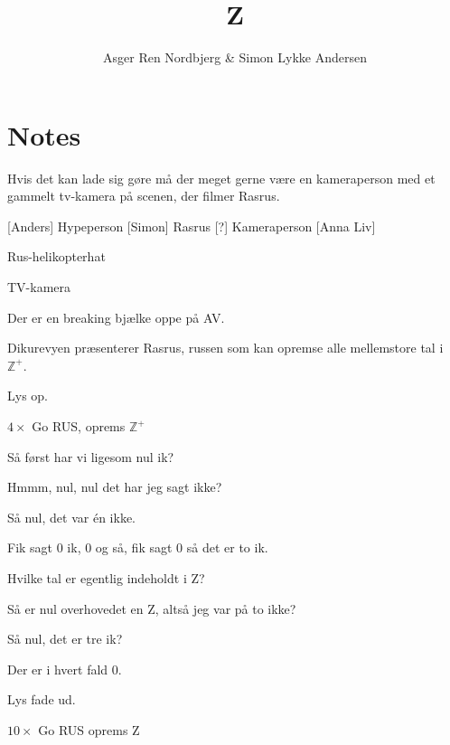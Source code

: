 \documentclass{article}
\title{Z}                   %
\author{Asger Ren Nordbjerg \& Simon Lykke Andersen}  %
\begin{document}
                
\maketitle
\section*{Notes}
Hvis det kan lade sig gøre må der meget gerne være en kameraperson med et gammelt tv-kamera på scenen, der filmer Rasrus.

\begin{roles}
[Anders] Hypeperson
[Simon] Rasrus
[?] Kameraperson
[Anna Liv]
\end{roles}
\begin{props}
\item Rus-helikopterhat
\item TV-kamera
\end{props}

\newpage%
\begin{sketch}
 Der er en breaking bjælke oppe på AV.

Dikurevyen præsenterer Rasrus, russen som kan opremse alle mellemstore tal i $\mathbb{Z}^+$.

\scene{}
Lys op.

$4\times$ Go RUS, oprems $\mathbb{Z}^+$ 

Så først har vi ligesom nul ik?

Hmmm, nul, nul det har jeg sagt ikke?

Så nul, det var én ikke.

Fik sagt 0 ik, 0 og så, fik sagt 0 så det er to ik.

Hvilke tal er egentlig indeholdt i Z?

Så er nul overhovedet en Z, altså jeg var på to ikke?

Så nul, det er tre ik? 

Der er i hvert fald 0.

\scene{}
Lys fade ud.

$10\times$ Go RUS oprems Z


\end{sketch}
\end{document}

